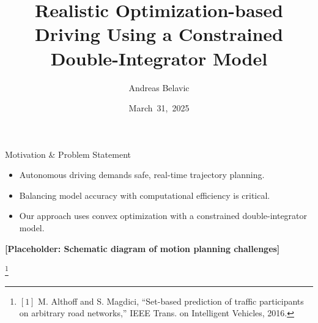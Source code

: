 \documentclass[shortpres,aspectratio=43]{beamer}
\title[Title]{Realistic Optimization-based Driving Using a Constrained Double-Integrator Model}
\author[Name]{Andreas Belavic}
\institute[TU M\"unchen]{Technical University of Munich}
\date{March~31,~2025}
\newcommand\blfootnote[1]{%
  \begingroup
  \renewcommand\thefootnote{}\footnote{#1}%
  \addtocounter{footnote}{-1}%
  \endgroup
}
\begin{document}

\begin{frame}[plain]
  \titlepage
\end{frame}

\begin{frame}{Motivation \& Problem Statement}
  \begin{itemize}
    \item Autonomous driving demands safe, real-time trajectory planning.
    \item Balancing model accuracy with computational efficiency is critical.
    \item Our approach uses convex optimization with a constrained double-integrator model.
  \end{itemize}
  \centering
  \textbf{[Placeholder: Schematic diagram of motion planning challenges]}


  \blfootnote{\tiny $[1]$ M.
    Althoff and S.
    Magdici, ``Set-based prediction of traffic participants on arbitrary road networks,'' IEEE Trans.
    on Intelligent Vehicles, 2016.}
\end{frame}
\end{document}
